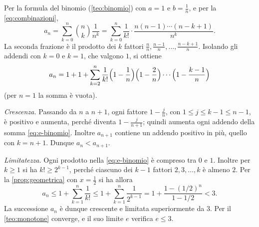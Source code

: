 \begin{dimostrazione}
Per la formula del binomio (\cref{teo:binomio}) con $a=1$ e $b=\frac1n$, e per la
\eqref{eq:combinazioni},
\[
  a_{n}=\sum_{k=0}^{n}\binom nk\frac1{n^{k}}
  =\sum_{k=0}^{n}\frac1{k!}\cdot\frac{n(n-1)\cdots(n-k+1)}{n^{k}} .
\]
La seconda frazione è il prodotto dei $k$ fattori $\frac nn,\frac{n-1}n,\dots,\frac{n-k+1}n$.
Isolando gli addendi con $k=0$ e $k=1$, che valgono $1$, si ottiene
\begin{equation}\label{eq:e-binomio}
  a_{n}=1+1+\sum_{k=2}^{n}\frac1{k!}\Bigl(1-\frac1n\Bigr)\Bigl(1-\frac2n\Bigr)\cdots
  \Bigl(1-\frac{k-1}n\Bigr)
\end{equation}
(per $n=1$ la somma è vuota).

\emph{Crescenza.} Passando da $n$ a $n+1$, ogni fattore $1-\frac jn$, con
$1\le j\le k-1\le n-1$, è positivo e aumenta, perché diventa $1-\frac j{n+1}$; quindi
aumenta ogni addendo della somma \eqref{eq:e-binomio}. Inoltre $a_{n+1}$ contiene un
addendo positivo in più, quello con $k=n+1$. Dunque $a_{n}<a_{n+1}$.

\emph{Limitatezza.} Ogni prodotto nella \eqref{eq:e-binomio} è compreso tra $0$ e $1$.
Inoltre per $k\ge1$ si ha $k!\ge2^{k-1}$, perché ciascuno dei $k-1$ fattori $2,3,\dots,k$
è almeno $2$. Per la \cref{prop:geometrica} con $x=\frac12$ si ha allora
\begin{equation}\label{eq:e-binomio-stima}
  a_{n}\le1+\sum_{k=1}^{n}\frac1{k!}\le1+\sum_{k=1}^{n}\frac1{2^{k-1}}
  =1+\frac{1-(1/2)^{n}}{1-1/2}<3 .
\end{equation}
La successione $a_{n}$ è dunque crescente e limitata superiormente da $3$. Per il
\cref{teo:monotone} converge, e il suo limite $e$ verifica $e\le3$.
\end{dimostrazione}

